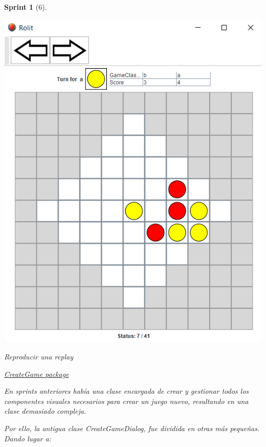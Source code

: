 \documentclass{article}
\theoremstyle{break}
\newtheorem*{sprint}{Sprint}
\begin{document}
\begin{sprint}[6]
\begin{center}
\includegraphics[scale=1]{replay-sprint-6.png}

Reproducir una \textit{replay}
\end{center}

\underline{CreateGame package}

En sprints anteriores había una clase encargada de crear y gestionar todos los componentes visuales necesarios para crear un juego nuevo, resultando en una clase demasiado compleja.

Por ello, la antigua clase \textit{CreateGameDialog}, fue dividida en otras más pequeñas. Dando lugar a:


\end{sprint}
\end{document}
